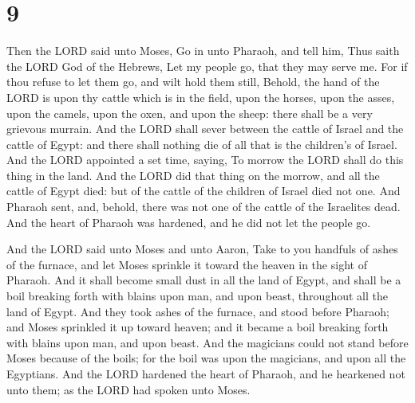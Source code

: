 \hypertarget{section-8}{%
\section{9}\label{section-8}}

 Then the LORD said unto Moses, Go in unto Pharaoh, and
tell him, Thus saith the LORD God of the Hebrews, Let my people go, that
they may serve me.  For if thou refuse to let them go, and
wilt hold them still,  Behold, the hand of the LORD is
upon thy cattle which is in the field, upon the horses, upon the asses,
upon the camels, upon the oxen, and upon the sheep: there shall be a
very grievous murrain.  And the LORD shall sever between
the cattle of Israel and the cattle of Egypt: and there shall nothing
die of all that is the children's of Israel.  And the LORD
appointed a set time, saying, To morrow the LORD shall do this thing in
the land.  And the LORD did that thing on the morrow, and
all the cattle of Egypt died: but of the cattle of the children of
Israel died not one.  And Pharaoh sent, and, behold, there
was not one of the cattle of the Israelites dead. And the heart of
Pharaoh was hardened, and he did not let the people go.

 And the LORD said unto Moses and unto Aaron, Take to you
handfuls of ashes of the furnace, and let Moses sprinkle it toward the
heaven in the sight of Pharaoh.  And it shall become small
dust in all the land of Egypt, and shall be a boil breaking forth with
blains upon man, and upon beast, throughout all the land of Egypt.
 And they took ashes of the furnace, and stood before
Pharaoh; and Moses sprinkled it up toward heaven; and it became a boil
breaking forth with blains upon man, and upon beast.  And
the magicians could not stand before Moses because of the boils; for the
boil was upon the magicians, and upon all the Egyptians. 
And the LORD hardened the heart of Pharaoh, and he hearkened not unto
them; as the LORD had spoken unto Moses.

